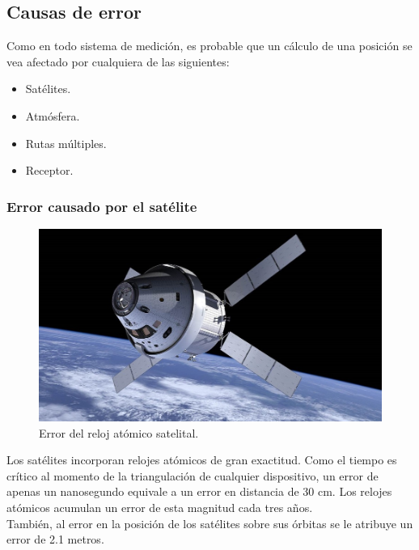 \subsection{Causas de error}

Como en todo sistema de medición, es probable que un cálculo de una posición se vea afectado por cualquiera de las siguientes: 

\begin{itemize}
	\item Satélites.
	\item Atmósfera.
	\item Rutas múltiples.
	\item Receptor.
\end{itemize} 

\subsubsection{Error causado por el satélite}

\begin{figure}[!ht]
\centering
\includegraphics[scale=0.23]{Figures/Sat}
\caption[Error del reloj atómico satelital.]{Error del reloj atómico satelital\footnotemark.}
\label{fig:ErrSat}
\end{figure}


Los satélites incorporan relojes atómicos de gran exactitud. Como el tiempo es crítico al momento de la triangulación de cualquier dispositivo, un error de apenas un nanosegundo equivale a un error en distancia de 30 cm. Los relojes atómicos acumulan un error de esta magnitud cada tres años. \\

También, al error en la posición de los satélites sobre sus órbitas se le atribuye un error de 2.1 metros.

